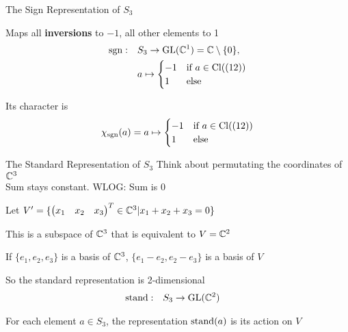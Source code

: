 \begin{frame}{The Sign Representation of $S_3$}
    \large
    
    Maps all \textbf{inversions} to $-1$, all other elements to 1
    \begin{align*}
        \operatorname{sgn}: \quad & S_3 \to \operatorname{GL}(\mathbb{C}^1) = \mathbb{C} \setminus \{0\}, \\
        & a \mapsto \begin{cases}
            -1 & \text{if } a \in \operatorname{Cl}((12)) \\
            1 & \text{else}
        \end{cases}
    \end{align*}

    \pause
    Its character is
    \begin{align*}
        \chi_{\operatorname{sgn}}(a) = a \mapsto \begin{cases}
            -1 & \text{if } a \in \operatorname{Cl}((12)) \\
            1 & \text{else}
        \end{cases}
    \end{align*}
\end{frame}

\begin{frame}{The Standard Representation of $S_3$}
    \large
    Think about permutating the coordinates of $\mathbb{C}^3$ \pause \\
    Sum stays constant. \pause WLOG: Sum is 0

    Let $V' = \{\begin{pmatrix}
        x_1 & x_2 & x_3
    \end{pmatrix}^T \in \mathbb{C}^3 | x_1 + x_2 + x_3 = 0\}$
    
    \pause
    \vspace{1em}
    This is a subspace of $\mathbb{C}^3$ that is equivalent to $V = \mathbb{C}^2$

    If $\{e_1, e_2, e_3\}$ is a basis of $\mathbb{C}^3$,
    $\{e_1 - e_2, e_2 - e_3\}$ is a basis of $V$
    
    \pause
    \vspace{1em}
    So the standard representation is 2-dimensional
    \begin{align*}
        \operatorname{stand}: \quad & S_3 \to \operatorname{GL}(\mathbb{C}^2)
    \end{align*}
    
    \pause
    For each element $a \in S_3$, the representation $\operatorname{stand}(a)$ is its action on $V$
\end{frame}

